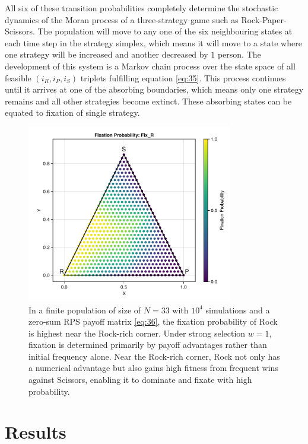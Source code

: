 \documentclass{article}
\begin{document}
All six of these transition probabilities completely determine the stochastic dynamics of the Moran process of a three-strategy game such as Rock-Paper-Scissors.
The population will move to any one of the six neighbouring states at each time step in the strategy simplex, which means it will move to a state where one strategy will be increased and another decreased by $1$ person.
The development of this system is a Markov chain process over the state space of all feasible $(i_R, i_P, i_S)$ triplets fulfilling equation \eqref{eq:35}.
This process continues until it arrives at one of the absorbing boundaries, which means only one strategy remains and all other strategies become extinct.
These absorbing states can be equated to fixation of single strategy.
\begin{figure}[H]
    \centering
    \includegraphics[width=0.8\textwidth]{RPS_FP.pdf}
    \caption{In a finite population of size of $N = 33$ with $ 10^4$ simulations and a zero-sum RPS payoff matrix \eqref{eq:36}, the fixation probability of Rock is highest near the Rock-rich corner. Under strong selection $w=1$, fixation is determined primarily by payoff advantages rather than initial frequency alone. Near the Rock-rich corner, Rock not only has a numerical advantage but also gains high fitness from frequent wins against Scissors, enabling it to dominate and fixate with high probability.}
    \label{fig:6}
\end{figure}



\section{Results}
\end{document}

